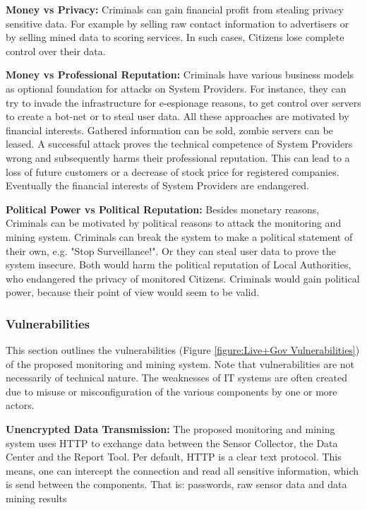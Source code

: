 \textbf{Money vs Privacy:}
Criminals can gain financial profit from stealing privacy sensitive data.
For example by selling raw contact information to advertisers or by selling mined data to scoring services.
In such cases, Citizens lose complete control over their data.


\textbf{Money vs Professional Reputation:}
Criminals have various business models as optional foundation for attacks on System Providers.
For instance, they can try to invade the infrastructure for e-espionage reasons, to get control over servers to create a bot-net or to steal user data.
All these approaches are motivated by financial interests.
Gathered information can be sold, zombie servers can be leased.
A successful attack proves the technical competence of System Providers wrong and subsequently harms their professional reputation.
This can lead to a loss of future customers or a decrease of stock price for registered companies.
Eventually the financial interests of System Providers are endangered.


\textbf{Political Power vs Political Reputation:}
Besides monetary reasons, Criminals can be motivated by political reasons to attack the monitoring and mining system.
Criminals can break the system to make a political statement of their own, e.g. "Stop Surveillance!".
Or they can steal user data to prove the system insecure.
Both would harm the political reputation of Local Authorities, who endangered the privacy of monitored Citizens.
Criminals would gain political power, because their point of view would seem to be valid.




\subsubsection{Vulnerabilities}
\label{subsubsection:Vulnerabilities}
This section outlines the vulnerabilities (Figure \ref{figure:Live+Gov Vulnerabilities}) of the proposed monitoring and mining system.
Note that vulnerabilities are not necessarily of technical nature.
The weaknesses of IT systems are often created due to misuse or misconfiguration of the various components by one or more actors.



\textbf{Unencrypted Data Transmission:}
The proposed monitoring and mining system uses HTTP to exchange data between the Sensor Collector, the Data Center and the Report Tool.
Per default, HTTP is a clear text protocol.
This means, one can intercept the connection and read all sensitive information, which is send between the components.
That is: passwords, raw sensor data and data mining results

